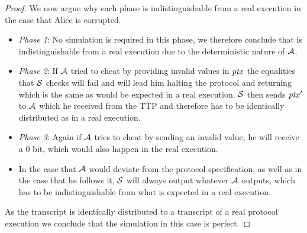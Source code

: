 \begin{proof}
    We now argue why each phase is indistinguishable from a real execution in the case that Alice is corrupted.

    \begin{itemize}
        \item \textit{Phase 1}: No simulation is required in this phase, we therefore conclude that is indistinguishable from a real execution due to the deterministic nature of $\mathcal{A}$.
        \item \textit{Phase 2}: If $\mathcal{A}$ tried to cheat by providing invalid values in $\mathit{ptx}$ the equalities that $\mathcal{S}$ checks will fail and will lead him halting the protocol and returning which is the same as would be expected in a real execution.
        $\mathcal{S}$ then sends ${\mathit{ptx}}'$ to $\mathcal{A}$ which he received from the TTP and therefore has to be identically distributed as in a real execution.
        \item \textit{Phase 3}: Again if $\mathcal{A}$ tries to cheat by sending an invalid value, he will receive a 0 bit, which would also happen in the real execution.
        \item In the case that $\mathcal{A}$ would deviate from the protocol specification, as well as in the case that he follows it, $\mathcal{S}$ will always output whatever $\mathcal{A}$ outputs, which has to be indistinguishable from what is expected in a real execution.
    \end{itemize}

    As the transcript is identically distributed to a transcript of a real protocol execution we conclude that the simulation in this case is perfect.


\end{proof}
